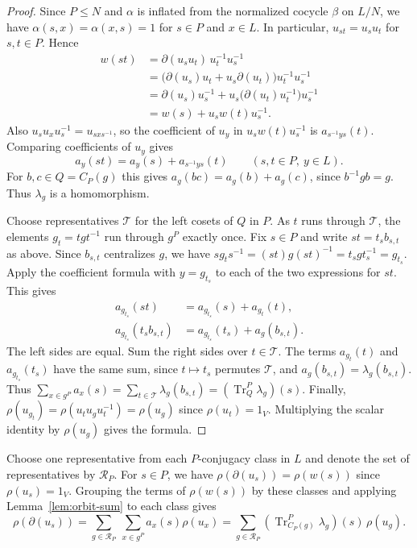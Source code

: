 \documentclass[11pt,a4paper]{article}
\theoremstyle{definition}
\theoremstyle{remark}
\numberwithin{equation}{section}
\begin{document}
	\begin{proof}
		Since $P\leq N$ and $\alpha$ is inflated from the normalized cocycle
		$\beta$ on $L/N$, we have $\alpha(s,x)=\alpha(x,s)=1$ for $s\in P$
		and $x\in L$. In particular, $u_{st}=u_su_t$ for $s,t\in P$. Hence
		\[
		\begin{aligned}
			w(st)
			&=\partial(u_su_t)\,u_t^{-1}u_s^{-1}\\
			&=\bigl(\partial(u_s)u_t+u_s\partial(u_t)\bigr)u_t^{-1}u_s^{-1}\\
			&=\partial(u_s)u_s^{-1}+u_s\bigl(\partial(u_t)u_t^{-1}\bigr)u_s^{-1}\\
			&=w(s)+u_s w(t)u_s^{-1}.
		\end{aligned}
		\]
		Also $u_su_xu_s^{-1}=u_{sxs^{-1}}$, so the coefficient of $u_y$ in
		$u_sw(t)u_s^{-1}$ is $a_{s^{-1}ys}(t)$. Comparing coefficients of $u_y$ gives
		\[
		a_y(st)=a_y(s)+a_{s^{-1}ys}(t)\qquad(s,t\in P,\ y\in L).
		\]
		For $b,c\in Q=C_P(g)$ this gives $a_g(bc)=a_g(b)+a_g(c)$, since
		$b^{-1}gb=g$. Thus $\lambda_g$ is a homomorphism.
		
		Choose representatives $\mathcal T$ for the left cosets of $Q$ in $P$.
		As $t$ runs through $\mathcal T$, the elements $g_t=tgt^{-1}$ run through
		$g^P$ exactly once. Fix $s\in P$ and write $st=t_s b_{s,t}$ as above.
		Since $b_{s,t}$ centralizes $g$, we have
		$s g_t s^{-1}=(st)g(st)^{-1}=t_sgt_s^{-1}=g_{t_s}$.
		Apply the coefficient formula with $y=g_{t_s}$ to each of the two
		expressions for $st$. This gives
		\[
		\begin{aligned}
			a_{g_{t_s}}(st)&=a_{g_{t_s}}(s)+a_{g_t}(t),\\
			a_{g_{t_s}}(t_s b_{s,t})&=a_{g_{t_s}}(t_s)+a_g(b_{s,t}).
		\end{aligned}
		\]
		The left sides are equal. Sum the right sides over $t\in\mathcal T$.
		The terms $a_{g_t}(t)$ and $a_{g_{t_s}}(t_s)$ have the same sum, since
		$t\mapsto t_s$ permutes $\mathcal T$, and $a_g(b_{s,t})=\lambda_g(b_{s,t})$.
		Thus $\sum_{x\in g^P}a_x(s)=\sum_{t\in\mathcal T}\lambda_g(b_{s,t})
		=(\operatorname{Tr}_{Q}^P\lambda_g)(s)$.
		Finally, $\rho(u_{g_t})=\rho(u_tu_gu_t^{-1})=\rho(u_g)$ since
		$\rho(u_t)=1_V$. Multiplying the scalar identity by $\rho(u_g)$ gives the formula.
	\end{proof}
	
	Choose one representative from each $P$-conjugacy class in $L$ and denote
	the set of representatives by $\mathcal R_P$.
	For $s\in P$, we have $\rho(\partial(u_s))=\rho(w(s))$ since $\rho(u_s)=1_V$.
	Grouping the terms of $\rho(w(s))$ by these classes and applying
	Lemma~\ref{lem:orbit-sum} to each class gives
	\[
	\rho(\partial(u_s))
	=\sum_{g\in\mathcal R_P}\ \sum_{x\in g^P} a_x(s)\rho(u_x)
	=\sum_{g\in\mathcal R_P}
	(\operatorname{Tr}_{C_P(g)}^P\lambda_g)(s)\,\rho(u_g).
	\]
	
\end{document}
